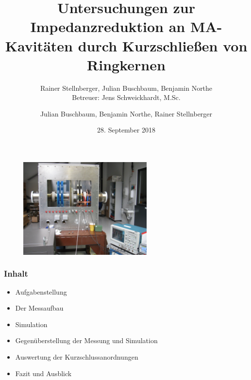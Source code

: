 \documentclass[accentcolor=tud9b, colorbacktitle, inverttitle]{tudbeamer}
\author{Julian Buschbaum, Benjamin Northe, Rainer Stellnberger}
\institute{Institut TEMF~\textbar~Fachgebiet Beschleunigertechnik}
\date{28. September 2018}
\title{Untersuchungen zur Impedanzreduktion an MA-Kavitäten durch Kurzschließen von Ringkernen \vspace{0.2em}}
\subtitle{Rainer Stellnberger, Julian Buschbaum, Benjamin Northe \\ {\small Betreuer: Jens Schweickhardt, M.Sc.}\vspace{-0.2em}\\\vspace{-0.7em}{\small Fachgebietsleiter: Prof. Dr.-Ing. Harald Klingbeil}}
\begin{document}

\begin{titleframe}
\vspace{-0.75em}
	\begin{figure}[h]
		\centering
		\includegraphics[width=0.6\textwidth]{Kavitaet}
	\end{figure}
\end{titleframe}




\begin{frame}\frametitle{Inhalt}
	\begin{itemize}
		\item Aufgabenstellung
		\item Der Messaufbau
		\item Simulation
		\item Gegen\"uberstellung der Messung und Simulation
		\item Auswertung der Kurzschlussanordnungen
		\item Fazit und Ausblick
	\end{itemize}
\end{frame}
\end{document}
